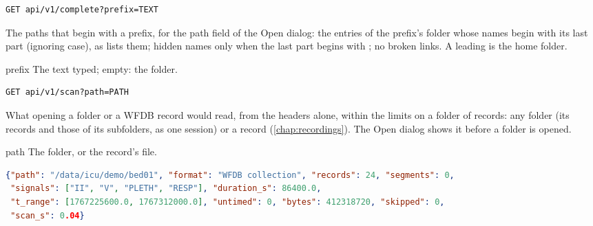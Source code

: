 \begin{lstlisting}[style=signature]
GET api/v1/complete?prefix=TEXT
\end{lstlisting}
The paths that begin with a prefix, for the path field of the Open dialog: the entries of the
prefix's folder whose names begin with its last part (ignoring case), as  lists
them; hidden names only when the last part begins with ; no broken links. A leading
\code{\textasciitilde} is the home folder.
\begin{params}
\item[prefix] The text typed; empty: the  folder.
\end{params}

\begin{lstlisting}[style=signature]
GET api/v1/scan?path=PATH
\end{lstlisting}
What opening a folder or a WFDB record would read, from the headers alone, within the limits on
a folder of records: any folder (its records and those of its subfolders, as one session) or a
record (\cref{chap:recordings}). The Open dialog shows it before a folder is opened.
\begin{params}
\item[path] The folder, or the record's  file.
\end{params}
\begin{lstlisting}[language=JSON]
{"path": "/data/icu/demo/bed01", "format": "WFDB collection", "records": 24, "segments": 0,
 "signals": ["II", "V", "PLETH", "RESP"], "duration_s": 86400.0,
 "t_range": [1767225600.0, 1767312000.0], "untimed": 0, "bytes": 412318720, "skipped": 0,
 "scan_s": 0.04}
\end{lstlisting}

